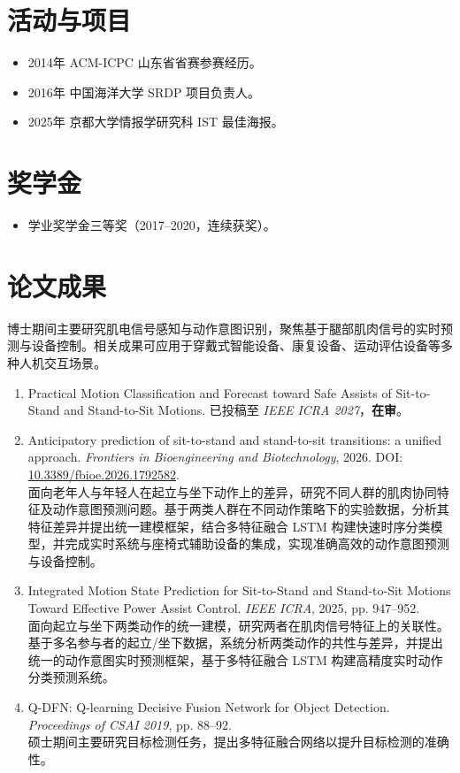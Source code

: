 \documentclass[10pt,letterpaper]{article}
\begin{document}
\section*{活动与项目}
\begin{itemize}
  \item 2014年 ACM-ICPC 山东省省赛参赛经历。
  \item 2016年 中国海洋大学 SRDP 项目负责人。
  \item 2025年 京都大学情报学研究科 IST 最佳海报。
\end{itemize}

\section*{奖学金}
\begin{itemize}
  \item 学业奖学金三等奖（2017--2020，连续获奖）。
\end{itemize}

\section*{论文成果}
博士期间主要研究肌电信号感知与动作意图识别，聚焦基于腿部肌肉信号的实时预测与设备控制。相关成果可应用于穿戴式智能设备、康复设备、运动评估设备等多种人机交互场景。

\begin{enumerate}
  \item Practical Motion Classification and Forecast toward Safe Assists of Sit-to-Stand and Stand-to-Sit Motions. 已投稿至 \textit{IEEE ICRA 2027}，\textbf{在审}。

  \item Anticipatory prediction of sit-to-stand and stand-to-sit transitions: a unified approach. \textit{Frontiers in Bioengineering and Biotechnology}, 2026. DOI: \href{https://doi.org/10.3389/fbioe.2026.1792582}{10.3389/fbioe.2026.1792582}.\\
  面向老年人与年轻人在起立与坐下动作上的差异，研究不同人群的肌肉协同特征及动作意图预测问题。基于两类人群在不同动作策略下的实验数据，分析其特征差异并提出统一建模框架，结合多特征融合 LSTM 构建快速时序分类模型，并完成实时系统与座椅式辅助设备的集成，实现准确高效的动作意图预测与设备控制。

  \item Integrated Motion State Prediction for Sit-to-Stand and Stand-to-Sit Motions Toward Effective Power Assist Control. \textit{IEEE ICRA}, 2025, pp. 947--952.\\
  面向起立与坐下两类动作的统一建模，研究两者在肌肉信号特征上的关联性。基于多名参与者的起立/坐下数据，系统分析两类动作的共性与差异，并提出统一的动作意图实时预测框架，基于多特征融合 LSTM 构建高精度实时动作分类预测系统。

  \item Q-DFN: Q-learning Decisive Fusion Network for Object Detection. \textit{Proceedings of CSAI 2019}, pp. 88--92.\\
  硕士期间主要研究目标检测任务，提出多特征融合网络以提升目标检测的准确性。
\end{enumerate}
\end{document}
